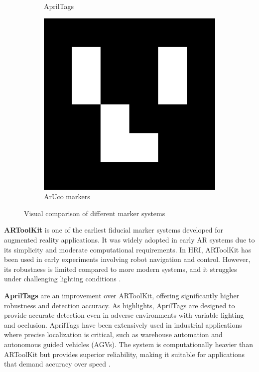 \begin{figure}[ht]
\begin{subfigure}[b]{0.25\textwidth}
        \caption{AprilTags}
        \label{fig:apriltags}
    \end{subfigure}
    \hfill
    \begin{subfigure}[b]{0.25\textwidth}
        \centering
        \includegraphics[width=\textwidth]{ch1/figs/ArUco.png}
        \caption{ArUco markers}
        \label{fig:aruco}
    \end{subfigure}
    \caption{Visual comparison of different marker systems}
    \label{fig:markers}
\end{figure}

\textbf{ARToolKit} is one of the earliest fiducial marker systems developed for augmented reality applications. It was widely adopted in early AR systems due to its simplicity and moderate computational requirements. In HRI, ARToolKit has been used in early experiments involving robot navigation and control. However, its robustness is limited compared to more modern systems, and it struggles under challenging lighting conditions \cite{Suzuki2022}.

\textbf{AprilTags} are an improvement over ARToolKit, offering significantly higher robustness and detection accuracy. As \cite{Daponte2020} highlights, AprilTags are designed to provide accurate detection even in adverse environments with variable lighting and occlusion. AprilTags have been extensively used in industrial applications where precise localization is critical, such as warehouse automation and autonomous guided vehicles (AGVs). The system is computationally heavier than ARToolKit but provides superior reliability, making it suitable for applications that demand accuracy over speed \cite{Filus2023}.


